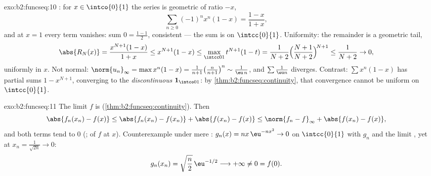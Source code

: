 \begin{solution}{exo:b2:funcseq:10}
: for $x \in \intco{0}{1}$ the series is geometric of
ratio $-x$,
\[
\sum_{n\geq0}(-1)^n x^n(1-x) = \frac{1-x}{1+x},
\]
and at $x = 1$ every term vanishes: sum $0 = \frac{1-1}{2}$,
consistent --- the sum is  on $\intcc{0}{1}$.
Uniformity: the remainder is a geometric tail,
\[
\abs{R_N(x)} = \frac{x^{N+1}(1-x)}{1+x} \leq x^{N+1}(1 - x)
\leq \max_{\intcc01} t^{N+1}(1-t)
= \frac{1}{N+2}\Bigl(\frac{N+1}{N+2}\Bigr)^{\!N+1}
\leq \frac{1}{N+2} \to 0 ,
\]
uniformly in $x$. Not normal: $\norm{u_n}_\infty =
\max x^n(1-x) = \frac{1}{n+1}\bigl(\frac{n}{n+1}\bigr)^n \sim
\frac{1}{\eu\,n}$, and $\sum \frac1{\eu n}$ diverges. Contrast:
$\sum x^n(1-x)$ has partial sums $1 - x^{N+1}$, converging
 to the \emph{discontinuous} $\mathbf 1_{\intco01}$: by
\cref{thm:b2:funcseq:continuity}, that convergence cannot be
uniform on $\intcc{0}{1}$.
\end{solution}

\begin{solution}{exo:b2:funcseq:11}
The limit $f$ is  (\cref{thm:b2:funcseq:continuity}).
Then
\[
\abs{f_n(x_n) - f(x)}
\leq \abs{f_n(x_n) - f(x_n)} + \abs{f(x_n) - f(x)}
\leq \norm{f_n - f}_\infty + \abs{f(x_n) - f(x)} ,
\]
and both terms tend to $0$ (;  of
$f$ at $x$). Counterexample under mere :
$g_n(x) = nx\,\eu^{-nx^2} \to 0$  on $\intcc{0}{1}$
with $g_n$ and the limit , yet at $x_n =
\frac{1}{\sqrt{2n}} \to 0$:
\[
g_n(x_n) = \sqrt{\frac n2}\,\eu^{-1/2} \longrightarrow +\infty
\neq 0 = f(0) .
\]
\end{solution}

